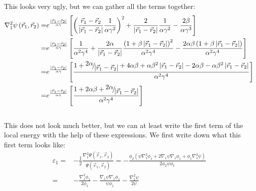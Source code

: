 This looks very ugly, but we can gather all the terms together:
 \begin{align}
 \nabla _1^2\psi \left( {{{\vec r}_1},{{\vec r}_2}} \right) =& {e^{\frac{{\left| {{{\vec r}_1} - {{\vec r}_2}} \right|}}{{\alpha \gamma }}}}\left[ {{{\left( {\frac{{{{\vec r}_1} - {{\vec r}_2}}}{{\left| {{{\vec r}_1} - {{\vec r}_2}} \right|}}\frac{1}{{\alpha {\gamma ^2}}}} \right)}^2} + \frac{2}{{\left| {{{\vec r}_1} - {{\vec r}_2}} \right|}}\frac{1}{{\alpha {\gamma ^2}}} - \frac{{2\beta }}{{\alpha {\gamma ^3}}}} \right]\nonumber\\
  =& {e^{\frac{{\left| {{{\vec r}_1} - {{\vec r}_2}} \right|}}{{\alpha \gamma }}}}\left[ {\frac{1}{{{\alpha ^2}{\gamma ^4}}} + \frac{{2\alpha }}{{\left| {{{\vec r}_1} - {{\vec r}_2}} \right|}}\frac{{{{\left( {1 + \beta \left| {{{\vec r}_1} - {{\vec r}_2}} \right|} \right)}^2}}}{{{\alpha ^2}{\gamma ^4}}} - \frac{{2\alpha \beta \left( {1 + \beta \left| {{{\vec r}_1} - {{\vec r}_2}} \right|} \right)}}{{{\alpha ^2}{\gamma ^4}}}} \right]\nonumber\\
  =& {e^{\frac{{\left| {{{\vec r}_1} - {{\vec r}_2}} \right|}}{{\alpha \gamma }}}}\left[ {\frac{{1 + {\raise0.7ex\hbox{${2\alpha }$} \!\mathord{\left/
  {\vphantom {{2\alpha } {\left| {{{\vec r}_1} - {{\vec r}_2}} \right|}}}\right.\kern-\nulldelimiterspace}
 \!\lower0.7ex\hbox{${\left| {{{\vec r}_1} - {{\vec r}_2}} \right|}$}} + 4\alpha \beta  + \alpha {\beta ^2}\left| {{{\vec r}_1} - {{\vec r}_2}} \right| - 2\alpha \beta  - \alpha {\beta ^2}\left| {{{\vec r}_1} - {{\vec r}_2}} \right|}}{{{\alpha ^2}{\gamma ^4}}}} \right]\nonumber\\
  =& {e^{\frac{{\left| {{{\vec r}_1} - {{\vec r}_2}} \right|}}{{\alpha \gamma }}}}\left[ {\frac{{1 + 2\alpha \beta  + {\raise0.7ex\hbox{${2\alpha }$} \!\mathord{\left/
  {\vphantom {{2\alpha } {\left| {{{\vec r}_1} - {{\vec r}_2}} \right|}}}\right.\kern-\nulldelimiterspace}
 \!\lower0.7ex\hbox{${\left| {{{\vec r}_1} - {{\vec r}_2}} \right|}$}}}}{{{\alpha ^2}{\gamma ^4}}}} \right]
 \end{align}\\
This does not look much better, but we can at least write the first term of the local energy with the help of these expressions. We first write down what this first term looks like: 
\begin{align}
{\varepsilon _1} =&  - \frac{1}{2}\frac{{\nabla _1^2\Psi \left( {{{\vec r}_1},{{\vec r}_2}} \right)}}{{\Psi \left( {{{\vec r}_1},{{\vec r}_2}} \right)}} =  - \frac{{{\phi _2}\left( {\psi \nabla _1^2{\phi _1} + 2\nabla _1^{}\psi \nabla _1^{}{\phi _1} + {\phi _1}\nabla _1^2\psi } \right)}}{{2{\phi _2}\psi {\phi _1}}}\nonumber\\ =&  - \frac{{\nabla _1^2{\phi _1}}}{{2{\phi _1}}} - \frac{{\nabla _1^{}\psi \nabla _1^{}{\phi _1}}}{{\psi {\phi _1}}} - \frac{{\nabla _1^2\psi }}{{2\psi }}
\end{align}\\

